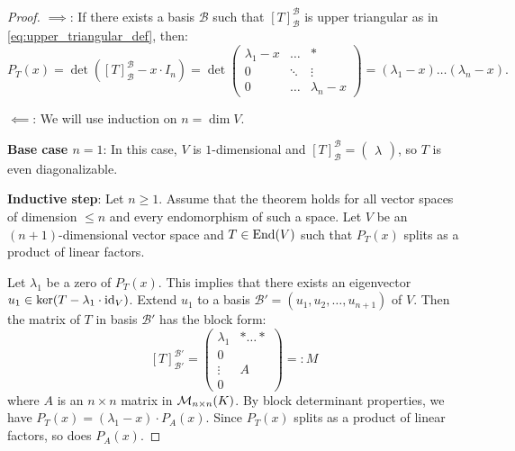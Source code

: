 \begin{proof}
  $\implies$: If there exists a basis $\mathcal{B}$ such that $[T]_{\mathcal{B}}^{\mathcal{B}}$ is upper triangular as in \eqref{eq:upper_triangular_def}, then:
  \[ P_T(x) = \det([T]_{\mathcal{B}}^{\mathcal{B}} - x \cdot I_n) = \det \begin{pmatrix} \lambda_1 - x & \dots & * \\ 0 & \ddots & \vdots \\ 0 & \dots & \lambda_n - x \end{pmatrix} = (\lambda_1 - x) \dots (\lambda_n - x). \]
  
  \noindent
  $\impliedby$: We will use induction on $n = \dim V$.

  \textbf{Base case $n=1$}: In this case, $V$ is $1$-dimensional and $[T]_{\mathcal{B}}^{\mathcal{B}} = \left(\begin{smallmatrix} \lambda \end{smallmatrix}\right)$, so $T$ is even diagonalizable.

  \textbf{Inductive step}: Let $n \ge 1$. Assume that the theorem holds for all vector spaces of dimension $\le n$ and every endomorphism of such a space.
  Let $V$ be an $(n+1)$-dimensional vector space and $T \in \operatorname{End}(V)$ such that $P_T(x)$ splits as a product of linear factors.

  Let $\lambda_1$ be a zero of $P_T(x)$. This implies that there exists an eigenvector $u_1 \in \ker(T - \lambda_1 \cdot \operatorname{id}_V)$.
  Extend $u_1$ to a basis $\mathcal{B}' = (u_1, u_2, \dots, u_{n+1})$ of $V$.
  Then the matrix of $T$ in basis $\mathcal{B}'$ has the block form:
  \begin{equation} \label{eq:M_block}
    [T]_{\mathcal{B}'}^{\mathcal{B}'} = \left(\begin{array}{c|c} \lambda_1 & * \dots * \\ \hline 0 & \\ \vdots & A \\ 0 & \end{array}\right) =: M
  \end{equation}
  where $A$ is an $n \times n$ matrix in $\mathcal{M}_{n \times n}(K)$.
  By block determinant properties, we have $P_T(x) = (\lambda_1 - x) \cdot P_A(x)$.
  Since $P_T(x)$ splits as a product of linear factors, so does $P_A(x)$.


\end{proof}
